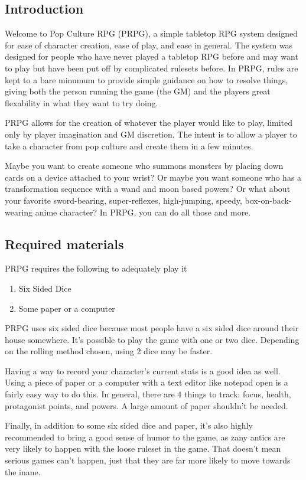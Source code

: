 \begin{flushleft}

\chapter{Introduction}

Welcome to Pop Culture RPG (PRPG), a simple tabletop RPG system designed
for ease of character creation, ease of play, and ease in general. The system
was designed for people who have never played a tabletop RPG before and may
want to play but have been put off by complicated rulesets before. In PRPG,
rules are kept to a bare minumum to provide simple guidance on how to resolve
things, giving both the person running the game (the GM) and the players great
flexability in what they want to try doing.

PRPG allows for the creation of whatever the player would like to play, limited
only by player imagination and GM discretion. The intent is to allow a player
to take a character from pop culture and create them in a few minutes.

Maybe you want to create someone who summons monsters by placing down cards on a
device attached to your wrist? Or maybe you want someone who has a
transformation sequence with a wand and moon based powers? Or what about your
favorite sword-bearing, super-reflexes, high-jumping, speedy,
box-on-back-wearing anime character? In PRPG, you can do all those and more.

\section*{Required materials}

PRPG requires the following to adequately play it

\begin{enumerate}
    \item Six Sided Dice
    \item Some paper or a computer
\end{enumerate}

PRPG uses six sided dice because most people have a six sided dice around
their house somewhere. It's possible to play the game with one or two dice.
Depending on the rolling method chosen, using 2 dice may be faster.

Having a way to record your character's current stats is a good idea as well.
Using a piece of paper or a computer with a text editor like notepad open is
a fairly easy way to do this. In general, there are 4 things to track: focus,
health, protagonist points, and powers. A large amount of paper shouldn't be
needed.

Finally, in addition to some six sided dice and paper, it's also highly
recommended to bring a good sense of humor to the game, as zany antics are very
likely to happen with the loose ruleset in the game. That doesn't mean serious
games can't happen, just that they are far more likely to move towards the
inane.

\end{flushleft}
